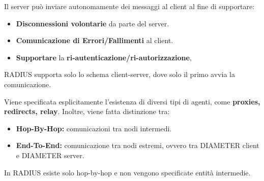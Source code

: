 \begin{proposition}
Il server può inviare autonomamente dei messaggi al client al fine di supportare:
    \begin{itemize}
        \item \textbf{Disconnessioni volontarie} da parte del server.
        \item \textbf{Comunicazione di Errori/Fallimenti} al client.
        \item \textbf{Supportare} la \textbf{ri-autenticazione/ri-autorizzazione},
    \end{itemize}
\end{proposition}
    \begin{note}
    RADIUS supporta solo lo schema client-server, dove solo il primo avvia la comunicazione.
    \end{note}
\begin{proposition}
Viene specificata esplicitamente l'esistenza di diversi tipi di agenti, come \textbf{proxies, redirects, relay}. Inoltre, viene fatta distinzione tra:
    \begin{itemize}
        \item \textbf{Hop-By-Hop:} comunicazioni tra nodi intermedi.
        \item \textbf{End-To-End:} comunicazione tra nodi estremi, ovvero tra DIAMETER client e DIAMETER server.
    \end{itemize}
\end{proposition}
\begin{note}
    In RADIUS esiste solo hop-by-hop e non vengono specificate entità intermedie.
\end{note}
